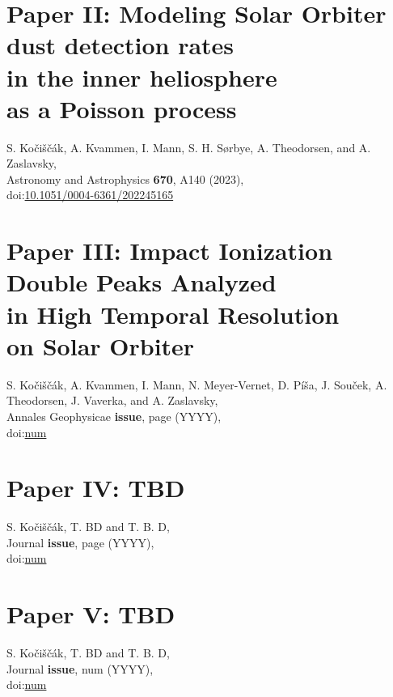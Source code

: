 \documentclass[11pt,twoside,openright]{book}
\begin{document}
\chapter{Paper II: Modeling Solar Orbiter \\ dust detection rates \\ in the inner heliosphere \\ as a Poisson process}
S. Ko{\v{c}}i{\v{s}}{\v{c}}{\'a}k, A. Kvammen, I. Mann, S. H. S{\o}rbye, A. Theodorsen, and A. Zaslavsky,\\
Astronomy and Astrophysics {\bf 670}, A140 (2023),\\
doi:\href{https://doi.org/10.1051/0004-6361/202245165}{10.1051/0004-6361/202245165}
\newpage\null\newpage



\chapter{Paper III: Impact Ionization \\ Double Peaks Analyzed \\ in High Temporal Resolution \\ on Solar Orbiter}
S. Ko{\v{c}}i{\v{s}}{\v{c}}{\'a}k, A. Kvammen, I. Mann, N. Meyer-Vernet, D. P{\'i}{\v{s}}a, J. Sou{\v{c}}ek, A. Theodorsen, J. Vaverka, and A. Zaslavsky,\\
Annales Geophysicae {\bf issue}, page (YYYY),\\
doi:\href{https://doi.org/num}{num}
\newpage\null\newpage
% 


\chapter{Paper IV: TBD}
S. Ko{\v{c}}i{\v{s}}{\v{c}}{\'a}k, T. BD and T. B. D,\\
Journal {\bf issue}, page (YYYY),\\
doi:\href{https://doi.org/num}{num}
\newpage\null\newpage
% 


\chapter{Paper V: TBD}
S. Ko{\v{c}}i{\v{s}}{\v{c}}{\'a}k, T. BD and T. B. D,\\
Journal {\bf issue}, num (YYYY),\\
doi:\href{https://doi.org/num}{num}
\newpage\null\newpage
% 
\end{document}

